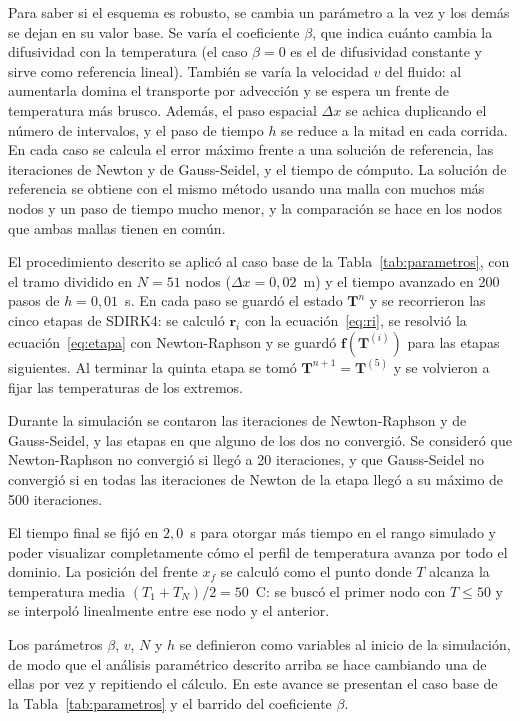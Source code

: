 \documentclass[final,5p,times,twocolumn,authoryear,11pt]{elsarticle}
\begin{document}

Para saber si el esquema es robusto, se cambia un parámetro a la vez y los demás se dejan en su valor base. Se varía el coeficiente $\beta$, que indica cuánto cambia la difusividad con la temperatura (el caso $\beta=0$ es el de difusividad constante y sirve como referencia lineal). También se varía la velocidad $v$ del fluido: al aumentarla domina el transporte por advección y se espera un frente de temperatura más brusco. Además, el paso espacial $\Delta x$ se achica duplicando el número de intervalos, y el paso de tiempo $h$ se reduce a la mitad en cada corrida. En cada caso se calcula el error máximo frente a una solución de referencia, las iteraciones de Newton y de Gauss-Seidel, y el tiempo de cómputo. La solución de referencia se obtiene con el mismo método usando una malla con muchos más nodos y un paso de tiempo mucho menor, y la comparación se hace en los nodos que ambas mallas tienen en común.


El procedimiento descrito se aplicó al caso base de la Tabla~\ref{tab:parametros}, con el tramo dividido en $N=51$ nodos ($\Delta x=0{,}02$~m) y el tiempo avanzado en 200 pasos de $h=0{,}01$~s. En cada paso se guardó el estado $\mathbf{T}^n$ y se recorrieron las cinco etapas de SDIRK4: se calculó $\mathbf{r}_i$ con la ecuación~\eqref{eq:ri}, se resolvió la ecuación~\eqref{eq:etapa} con Newton-Raphson y se guardó $\mathbf{f}(\mathbf{T}^{(i)})$ para las etapas siguientes. Al terminar la quinta etapa se tomó $\mathbf{T}^{n+1}=\mathbf{T}^{(5)}$ y se volvieron a fijar las temperaturas de los extremos. 

Durante la simulación se contaron las iteraciones de Newton-Raphson y de Gauss-Seidel, y las etapas en que alguno de los dos no convergió. Se consideró que Newton-Raphson no convergió si llegó a 20 iteraciones, y que Gauss-Seidel no convergió si en todas las iteraciones de Newton de la etapa llegó a su máximo de 500 iteraciones.

El tiempo final se fijó en $2{,}0$~s para otorgar más tiempo en el rango simulado y poder visualizar completamente cómo el perfil de temperatura avanza por todo el dominio. La posición del frente $x_f$ se calculó como el punto donde $T$ alcanza la temperatura media $(T_1+T_N)/2=50$~\textdegree C: se buscó el primer nodo con $T\leq 50$ y se interpoló linealmente entre ese nodo y el anterior.

Los parámetros $\beta$, $v$, $N$ y $h$ se definieron como variables al inicio de la simulación, de modo que el análisis paramétrico descrito arriba se hace cambiando una de ellas por vez y repitiendo el cálculo. En este avance se presentan el caso base de la Tabla~\ref{tab:parametros} y el barrido del coeficiente $\beta$.
\end{document}
